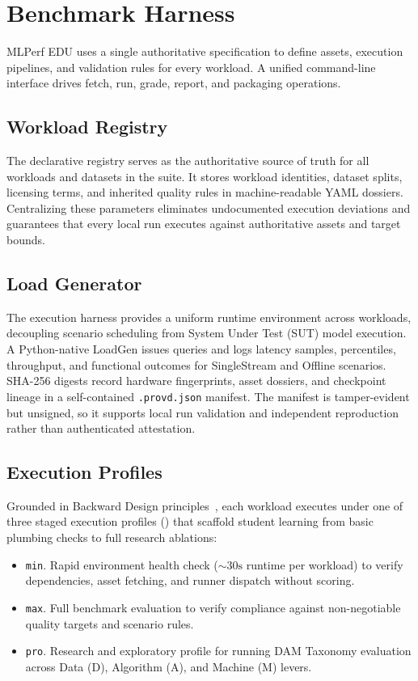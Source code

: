\documentclass[10pt,twocolumn]{article}
\begin{document}
\section{Benchmark Harness}
\label{sec:harness}

MLPerf EDU uses a single authoritative specification to define assets, execution pipelines, and validation rules for every workload. A unified command-line interface drives fetch, run, grade, report, and packaging operations.

\subsection{Workload Registry}

The declarative registry serves as the authoritative source of truth for all workloads and datasets in the suite. It stores workload identities, dataset splits, licensing terms, and inherited quality rules in machine-readable YAML dossiers. Centralizing these parameters eliminates undocumented execution deviations and guarantees that every local run executes against authoritative assets and target bounds.

\subsection{Load Generator}

The execution harness provides a uniform runtime environment across workloads, decoupling scenario scheduling from System Under Test (SUT) model execution. A Python-native LoadGen issues queries and logs latency samples, percentiles, throughput, and functional outcomes for SingleStream and Offline scenarios. SHA-256 digests record hardware fingerprints, asset dossiers, and checkpoint lineage in a self-contained \texttt{.provd.json} manifest. The manifest is tamper-evident but unsigned, so it supports local run validation and independent reproduction rather than authenticated attestation.

\subsection{Execution Profiles}

Grounded in Backward Design principles~\citep{wiggins2005understanding}, each workload executes under one of three staged execution profiles () that scaffold student learning from basic plumbing checks to full research ablations:
\begin{itemize}[leftmargin=*,itemsep=1.5pt]
\item \texttt{min}. Rapid environment health check ($\sim 30\text{s}$ runtime per workload) to verify dependencies, asset fetching, and runner dispatch without scoring.
\item \texttt{max}. Full benchmark evaluation to verify compliance against non-negotiable quality targets and scenario rules.
\item \texttt{pro}. Research and exploratory profile for running DAM Taxonomy evaluation across Data (D), Algorithm (A), and Machine (M) levers.
\end{itemize}
\end{document}
